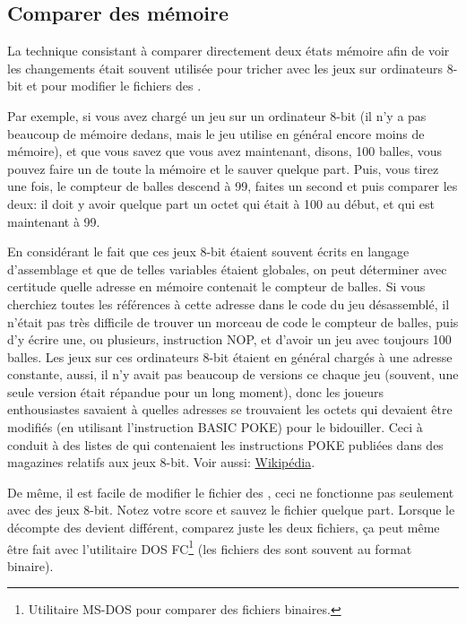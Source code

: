\subsection{Comparer des  mémoire}
\label{snapshots_comparing}

La technique consistant à comparer directement deux états mémoire afin de voir les
changements était souvent utilisée pour tricher avec les jeux sur ordinateurs 8-bit
et pour modifier le fichiers des .

Par exemple, si vous avez chargé un jeu sur un ordinateur 8-bit (il n'y a pas beaucoup
de mémoire dedans, mais le jeu utilise en général encore moins de mémoire), et que
vous savez que vous avez maintenant, disons, 100 balles, vous pouvez faire un 
de toute la mémoire et le sauver quelque part. Puis, vous tirez une fois, le compteur
de balles descend à 99, faites un second  et puis comparer les deux:
il doit y avoir quelque part un octet qui était à 100 au début, et qui est maintenant
à 99.

En considérant le fait que ces jeux 8-bit étaient souvent écrits en langage d'assemblage
et que de telles variables étaient globales, on peut déterminer avec certitude quelle
adresse en mémoire contenait le compteur de balles. Si vous cherchiez toutes les références
à cette adresse dans le code du jeu désassemblé, il n'était pas très difficile de
trouver un morceau de code  le compteur de balles,
puis d'y écrire une, ou plusieurs, instruction \gls{NOP}, et d'avoir un jeu avec
toujours 100 balles.
Les jeux sur ces ordinateurs 8-bit étaient en général chargés à une adresse constante,
aussi, il n'y avait pas beaucoup de versions ce chaque jeu (souvent, une seule version
était répandue pour un long moment), donc les joueurs enthousiastes savaient à quelles
adresses se trouvaient les octets qui devaient être modifiés (en utilisant l'instruction
BASIC \gls{POKE}) pour le bidouiller. Ceci à conduit à des listes de  qui
contenaient les instructions \gls{POKE} publiées dans des magazines relatifs aux
jeux 8-bit. Voir aussi: \href{http://go.yurichev.com/17114}{Wikipédia}.


De même, il est facile de modifier le fichier des , ceci ne fonctionne
pas seulement avec des jeux 8-bit. Notez votre score et sauvez le fichier quelque part.
Lorsque le décompte des  devient différent, comparez juste les
deux fichiers, ça peut même être fait avec l'utilitaire DOS FC\footnote{Utilitaire
MS-DOS pour comparer des fichiers binaires.} (les fichiers des 
sont souvent au format binaire).

